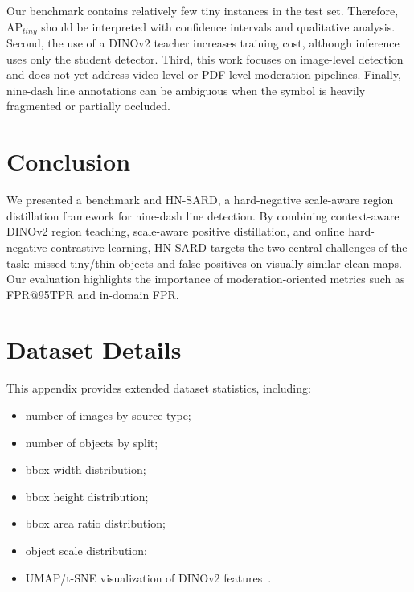 \documentclass[conference,a4paper]{IEEEtran}
\begin{document}
Our benchmark contains relatively few tiny instances in the test set.
Therefore, AP$_{tiny}$ should be interpreted with confidence intervals and qualitative analysis.
Second, the use of a DINOv2 teacher increases training cost, although inference uses only the student detector.
Third, this work focuses on image-level detection and does not yet address video-level or PDF-level moderation pipelines.
Finally, nine-dash line annotations can be ambiguous when the symbol is heavily fragmented or partially occluded.

\section{Conclusion}

We presented a benchmark and HN-SARD, a hard-negative scale-aware region distillation framework for nine-dash line detection.
By combining context-aware DINOv2 region teaching, scale-aware positive distillation, and online hard-negative contrastive learning, HN-SARD targets the two central challenges of the task: missed tiny/thin objects and false positives on visually similar clean maps.
Our evaluation highlights the importance of moderation-oriented metrics such as FPR@95TPR and in-domain FPR.




\clearpage
\appendix

\section{Dataset Details}
\label{app:dataset_details}

This appendix provides extended dataset statistics, including:
\begin{itemize}
    \item number of images by source type;
    \item number of objects by split;
    \item bbox width distribution;
    \item bbox height distribution;
    \item bbox area ratio distribution;
    \item object scale distribution;
    \item UMAP/t-SNE visualization of DINOv2 features~\cite{mcinnes2018umap,vandermaaten2008visualizing}.
\end{itemize}
\end{document}
